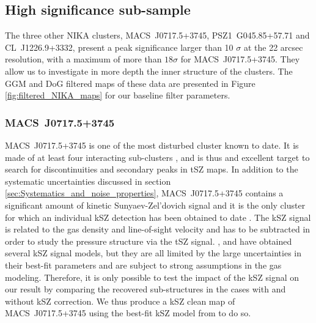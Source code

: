 \documentclass[twocolumn,traditabstract]{aa}
\begin{document}
\subsection{High significance sub-sample}
The three other NIKA clusters, \mbox{MACS~J0717.5+3745}, \mbox{PSZ1~G045.85+57.71} and \mbox{CL~J1226.9+3332}, present a peak significance larger than 10 $\sigma$ at the 22 arcsec resolution, with a maximum of more than $18 \sigma$ for \mbox{MACS~J0717.5+3745}. They allow us to investigate in more depth the inner structure of the clusters. The GGM and DoG filtered maps of these data are presented in Figure \ref{fig:filtered_NIKA_maps} for our baseline filter parameters.

\subsubsection{MACS~J0717.5+3745}\label{sec:MACSJ0717}
\mbox{MACS~J0717.5+3745} is one of the most disturbed cluster known to date. It is made of at least four interacting sub-clusters \citep{Ma2009}, and is thus and excellent target to search for discontinuities and secondary peaks in tSZ maps. In addition to the systematic uncertainties discussed in section \ref{sec:Systematics_and_noise_properties}, \mbox{MACS~J0717.5+3745} contains a significant amount of kinetic Sunyaev-Zel'dovich \citep[kSZ,][]{Sunyaev1980} signal and it is the only cluster for which an individual kSZ detection has been obtained to date \citep[][]{Mroczkowski2012,Sayers2013,Adam2016b}. The kSZ signal is related to the gas density and line-of-sight velocity and has to be subtracted in order to study the pressure structure via the tSZ signal. \cite{Mroczkowski2012}, \cite{Sayers2013} and \cite{Adam2016b} have obtained several kSZ signal models, but they are all limited by the large uncertainties in their best-fit parameters and are subject to strong assumptions in the gas modeling. Therefore, it is only possible to test the impact of the kSZ signal on our result by comparing the recovered sub-structures in the cases with and without kSZ correction. We thus produce a kSZ clean map of \mbox{MACS~J0717.5+3745} using the best-fit kSZ model from \cite{Adam2016b} to do so.
\end{document}
